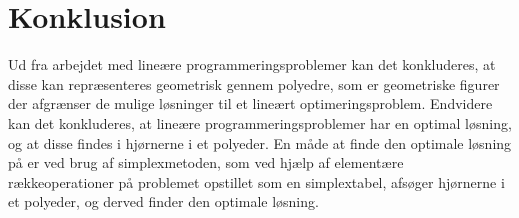 \chapter{Konklusion}
Ud fra arbejdet med lineære programmeringsproblemer kan det konkluderes, at disse kan repræsenteres geometrisk gennem polyedre, som er geometriske figurer der afgrænser de mulige løsninger til et lineært optimeringsproblem.
Endvidere kan det konkluderes, at lineære programmeringsproblemer har en optimal løsning, og at disse findes i hjørnerne i et polyeder.
En måde at finde den optimale løsning på er ved brug af simplexmetoden, som ved hjælp af elementære rækkeoperationer på problemet opstillet som en simplextabel, afsøger hjørnerne i et polyeder, og derved finder den optimale løsning.